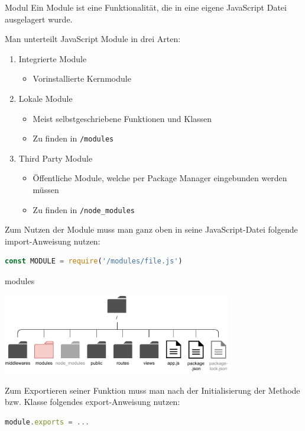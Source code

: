 \begin{defi}{Modul}
    Ein Module ist eine Funktionalität, die in eine eigene JavaScript Datei ausgelagert wurde.

    Man unterteilt JavaScript Module in drei Arten:
    \begin{enumerate}
        \item Integrierte Module
              \begin{itemize}
                  \item Vorinstallierte Kernmodule
              \end{itemize}
        \item Lokale Module
              \begin{itemize}
                  \item Meist selbstgeschriebene Funktionen und Klassen
                  \item Zu finden in \texttt{/modules}
              \end{itemize}
        \item Third Party Module
              \begin{itemize}
                  \item Öffentliche Module, welche per Package Manager eingebunden werden müssen
                  \item Zu finden in \texttt{/node\_modules}
              \end{itemize}
    \end{enumerate}

    Zum Nutzen der Module muss man ganz oben in seine JavaScript-Datei folgende import-Anweisung nutzen:
    \begin{lstlisting}[language=JavaScript]
        const MODULE = require('/modules/file.js')
    \end{lstlisting}
\end{defi}

\begin{bonus}{modules}
    \begin{center}
        \includegraphics[width=0.75\textwidth]{includes/figures/bonus_nodejs_module.pdf}
    \end{center}

    Zum Exportieren seiner Funktion muss man nach der Initialisierung der Methode bzw. Klasse folgendes export-Anweisung nutzen:
    \begin{lstlisting}[language=JavaScript]
        module.exports = ...
    \end{lstlisting}
\end{bonus}

